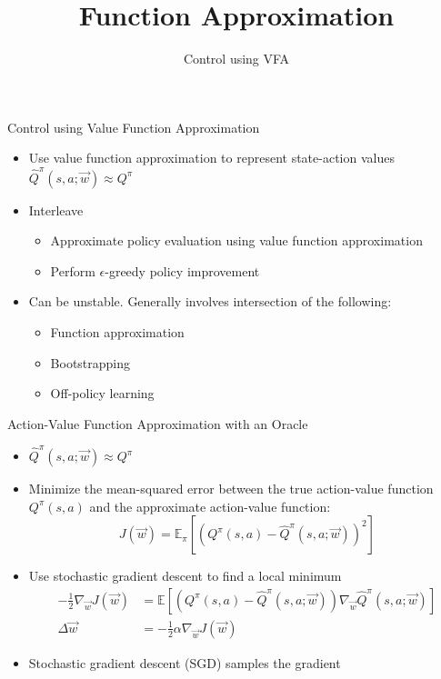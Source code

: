 \documentclass[aspectratio=169]{../latex_main/tntbeamer}  %
\title[RL: Function Approximation]{Function Approximation}
\subtitle{Control using VFA}
\begin{document}
	
	\maketitle

\begin{frame}[c]{Control using Value Function Approximation}
	
	\begin{itemize}
		\item Use value function approximation to represent state-action values $\hat{Q}^\pi(s,a;\vec{w}) \approx Q^\pi$
		\item Interleave
		\begin{itemize}
			\item Approximate policy evaluation using value function approximation
			\item Perform $\epsilon$-greedy policy improvement
		\end{itemize}
		\item Can be unstable. Generally involves intersection of the following:
		\begin{itemize}
			\item Function approximation
			\item Bootstrapping
			\item \alert{Off-policy learning}
		\end{itemize}
	\end{itemize}

\end{frame}
\begin{frame}[c]{Action-Value Function Approximation with an Oracle}

	\begin{itemize}
		\item $\hat{Q}^\pi(s,a;\vec{w}) \approx Q^\pi$
		\item Minimize the mean-squared error between the true action-value function $Q^\pi(s,a)$ and the approximate action-value function:
		$$J(\vec{w}) = \mathbb{E}_\pi [(Q^\pi(s,a) - \hat{Q}^\pi(s,a;\vec{w}))^2] $$
		\item Use stochastic gradient descent to find a local minimum
		\begin{align*}
			-\frac{1}{2}\nabla_{\vec{w}} J(\vec{w}) &= \mathbb{E}\left[ (Q^\pi(s,a) - \hat{Q}^\pi(s,a;\vec{w})) \nabla_{\vec{w}} \hat{Q}^\pi(s,a;\vec{w}) \right] \\
			\Delta \vec{w} &= -\frac{1}{2}\alpha\nabla_{\vec{w}} J(\vec{w})
		\end{align*}
		\item Stochastic gradient descent (SGD) samples the gradient
	\end{itemize}

\end{frame}
\end{document}
